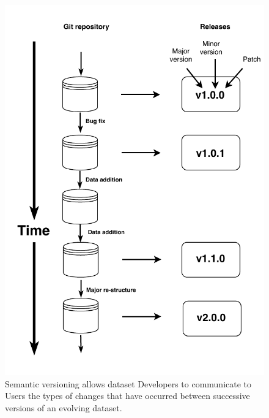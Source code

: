 \documentclass[a4paper,num-refs]{assets/oup-contemporary}
\begin{document}
\begin{figure}[!t]
\centering
\includegraphics[width=\linewidth]{figures/Figure-versions.pdf}
\caption{
Semantic versioning allows dataset Developers to communicate to Users the types of changes that have occurred between successive versions of an evolving dataset.}
\label{fig:semantic}
\end{figure}
\end{document}
